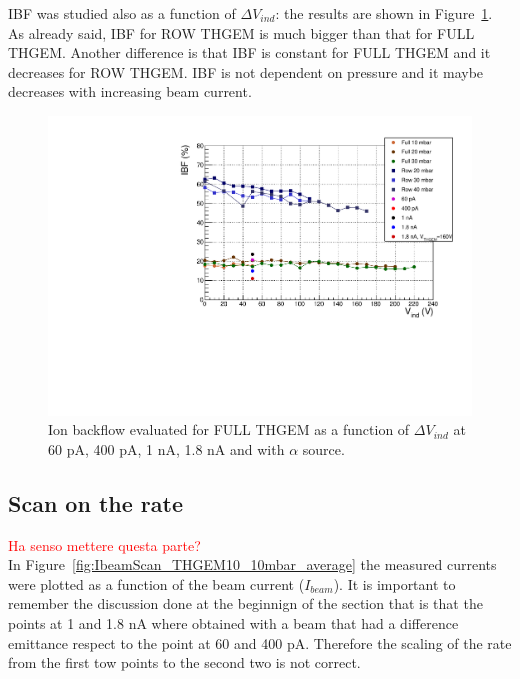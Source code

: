 \documentclass[a4paper, 11 pt]{report}
\newcommand{\Vind}{$\Delta V_{ind}$}
\newcommand{\ibeam}{$I_{beam}$}
\begin{document}
IBF was studied also as a function of \Vind: the results are shown in Figure~\ref{fig:IBFvsInd_beam}. 
As already said, IBF for ROW THGEM is much bigger than that for FULL THGEM. Another difference is 
that IBF is constant for FULL THGEM and it decreases for ROW THGEM. IBF is not dependent on 
pressure and it maybe decreases with increasing beam current.

\begin{figure}[!t]
	\centering
	\includegraphics[width=\textwidth]{Immagini/IBFvsInd_beam.pdf}
	\caption{Ion backflow evaluated for FULL THGEM as a function of \Vind{} at 60 pA, 400 pA, 1 nA, 
	1.8 nA and with $\alpha$ source.}
	\label{fig:IBFvsInd_beam}
\end{figure}


\subsection{Scan on the rate}

\textcolor{red}{Ha senso mettere questa parte?}\\
In Figure~\ref{fig:IbeamScan_THGEM10_10mbar_average} the measured currents were plotted as a function of the beam current (\ibeam). 
It is important to remember the discussion done at the beginnign of the section
that is that the points at 1 and 1.8 nA where obtained with a beam that had
a difference emittance respect to the point at 60 and 400 pA.
Therefore the scaling of the rate from the first tow points to the second two is not correct.
\end{document}
